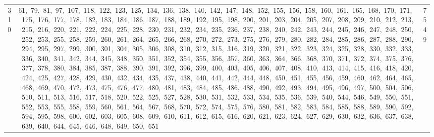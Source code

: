 \begin{longtable}{c|p{}|r}
310 & 61,\ 79,\ 81,\ 97,\ 107,\ 118,\ 122,\ 123,\ 125,\ 134,\ 136,\ 138,\ 140,\ 142,\ 147,\ 148,\ 152,\ 155,\ 156,\ 158,\ 160,\ 161,\ 165,\ 168,\ 170,\ 171,\ 175,\ 176,\ 177,\ 178,\ 182,\ 183,\ 184,\ 186,\ 187,\ 188,\ 189,\ 192,\ 195,\ 198,\ 200,\ 201,\ 203,\ 204,\ 205,\ 207,\ 208,\ 209,\ 210,\ 212,\ 213,\ 215,\ 216,\ 220,\ 221,\ 222,\ 224,\ 225,\ 228,\ 230,\ 231,\ 232,\ 234,\ 235,\ 236,\ 237,\ 238,\ 240,\ 242,\ 243,\ 244,\ 245,\ 246,\ 247,\ 248,\ 250,\ 252,\ 253,\ 255,\ 258,\ 259,\ 260,\ 261,\ 264,\ 265,\ 266,\ 268,\ 270,\ 272,\ 273,\ 275,\ 276,\ 279,\ 280,\ 282,\ 284,\ 285,\ 286,\ 287,\ 288,\ 290,\ 294,\ 295,\ 297,\ 299,\ 300,\ 301,\ 304,\ 305,\ 306,\ 308,\ 310,\ 312,\ 315,\ 316,\ 319,\ 320,\ 321,\ 322,\ 323,\ 324,\ 325,\ 328,\ 330,\ 332,\ 333,\ 336,\ 340,\ 341,\ 342,\ 344,\ 345,\ 348,\ 350,\ 351,\ 352,\ 354,\ 355,\ 356,\ 357,\ 360,\ 363,\ 364,\ 366,\ 368,\ 370,\ 371,\ 372,\ 374,\ 375,\ 376,\ 377,\ 378,\ 380,\ 384,\ 385,\ 387,\ 388,\ 390,\ 391,\ 392,\ 396,\ 399,\ 400,\ 403,\ 405,\ 406,\ 407,\ 408,\ 410,\ 413,\ 414,\ 415,\ 416,\ 418,\ 420,\ 424,\ 425,\ 427,\ 428,\ 429,\ 430,\ 432,\ 434,\ 435,\ 437,\ 438,\ 440,\ 441,\ 442,\ 444,\ 448,\ 450,\ 451,\ 455,\ 456,\ 459,\ 460,\ 462,\ 464,\ 465,\ 468,\ 469,\ 470,\ 472,\ 473,\ 475,\ 476,\ 477,\ 480,\ 481,\ 483,\ 484,\ 485,\ 486,\ 488,\ 490,\ 492,\ 493,\ 494,\ 495,\ 496,\ 497,\ 500,\ 504,\ 506,\ 510,\ 511,\ 513,\ 516,\ 517,\ 518,\ 520,\ 522,\ 525,\ 527,\ 528,\ 530,\ 531,\ 532,\ 533,\ 534,\ 535,\ 536,\ 539,\ 540,\ 544,\ 546,\ 549,\ 550,\ 551,\ 552,\ 553,\ 555,\ 558,\ 559,\ 560,\ 561,\ 564,\ 567,\ 568,\ 570,\ 572,\ 574,\ 575,\ 576,\ 580,\ 581,\ 582,\ 583,\ 584,\ 585,\ 588,\ 589,\ 590,\ 592,\ 594,\ 595,\ 598,\ 600,\ 602,\ 603,\ 605,\ 608,\ 609,\ 610,\ 611,\ 612,\ 615,\ 616,\ 620,\ 621,\ 623,\ 624,\ 627,\ 629,\ 630,\ 632,\ 636,\ 637,\ 638,\ 639,\ 640,\ 644,\ 645,\ 646,\ 648,\ 649,\ 650,\ 651 & 7549 \\

\end{longtable}
